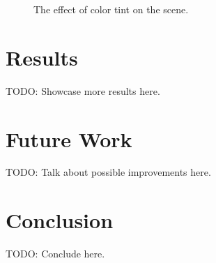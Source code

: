 \documentclass{article}
\begin{document}
\begin{figure}[h]
	\centering
	\hspace{1em}
	\caption{The effect of color tint on the scene.}
	\label{fig:scene_with_tint}
\end{figure}


\medskip \par
\noindent

\section{Results}

TODO: Showcase more results here.

\section{Future Work}

TODO: Talk about possible improvements here.

\section{Conclusion}

TODO: Conclude here.

\newpage
\appendix




\end{document}
